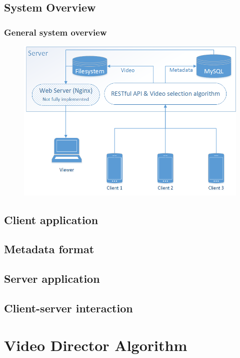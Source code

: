 \documentclass[10pt,pdf]{beamer}
\begin{document}
	\subsection{System Overview}
	\begin{frame}
		\frametitle{General system overview}
		\begin{figure}[!t]
			\centering
			\includegraphics[width=\textwidth,height=.9\textheight,keepaspectratio]{sys_arch.png}
			\label{fig:gen_arch}
		\end{figure}
	\end{frame}

	\subsection{Client application}
	
	
	\subsection{Metadata format}
	

	\subsection{Server application}
	

	\subsection{Client-server interaction}
	

\section{Video Director Algorithm}

	
\end{document}
